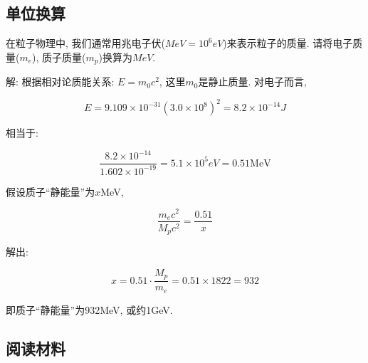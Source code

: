 \subsection*{单位换算}

在粒子物理中, 我们通常用兆电子伏($MeV = 10^6 eV $)来表示粒子的质量.
请将电子质量($m_e$), 质子质量($m_p$)换算为$MeV$.

解: 根据相对论质能关系: $E=m_0 c^2$, 这里$m_0$是静止质量.
对电子而言,

\begin{equation*}
E = 9.109 \times 10^{-31} (3.0 \times 10^8)^2 = 8.2 \times 10^{-14}
J
\end{equation*}

相当于:

\begin{equation*}
\frac{8.2 \times 10^{-14}}{1.602 \times 10^{-19}} = 5.1 \times 10^5
eV = 0.51 \text{MeV}
\end{equation*}

假设质子“静能量”为$x$MeV,

\begin{equation*}
\frac{m_e c^2}{M_p c^2}=\frac{0.51}{x}
\end{equation*}

解出:

\begin{equation*}
x = 0.51 \cdot \frac{M_p}{m_e} =0.51 \times 1822 = 932
\end{equation*}

即质子“静能量”为932MeV, 或约1GeV.

\subsection*{阅读材料}


